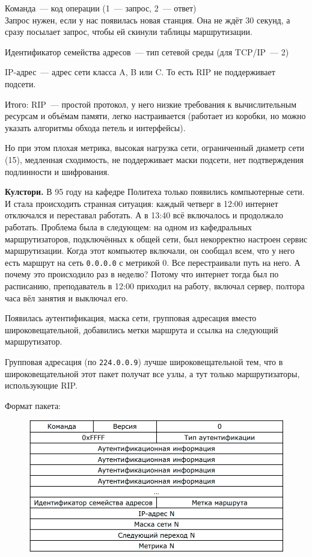\begin{MyItemize}
    \item Команда~--- код операции (1~--- запрос, 2~--- ответ)\\
    Запрос нужен, если у нас появилась новая станция. Она не ждёт 30 секунд, а сразу посылает запрос, чтобы ей скинули таблицы маршрутизации.
    \item Идентификатор семейства адресов~--- тип сетевой среды (для TCP/IP~--- 2)
    \item IP-адрес~--- адрес сети класса A, B или C. То есть RIP не поддерживает подсети.
\end{MyItemize}

Итого: RIP~--- простой протокол, у него низкие требования к вычислительным ресурсам и объёмам памяти, легко настраивается (работает из коробки, но можно указать алгоритмы обхода петель и интерфейсы).

Но при этом плохая метрика, высокая нагрузка сети, ограниченный диаметр сети (15), медленная сходимость, не поддерживает маски подсети, нет подтверждения подлинности и шифрования.

{\bf Кулстори.} В 95 году на кафедре Политеха только появились компьютерные сети. И стала происходить странная ситуация: каждый четверг в 12:00 интернет отключался и переставал работать. А в 13:40 всё включалось и продолжало работать. Проблема была в следующем: на одном из кафедральных маршрутизаторов, подключённых к общей сети, был некорректно настроен сервис маршрутизации. Когда этот компьютер включали, он сообщал всем, что у него есть маршрут на сеть {\tt 0.0.0.0} с метрикой 0. Все перестраивали путь на него. А почему это происходило раз в неделю? Потому что интернет тогда был по расписанию, преподаватель в 12:00 приходил на работу, включал сервер, полтора часа вёл занятия и выключал его.


Появилась аутентификация, маска сети, групповая адресация вместо широковещательной, добавились метки маршрута и ссылка на следующий маршрутизатор.

Групповая адресация (по {\tt 224.0.0.9}) лучше широковещательной тем, что в широковещательной этот пакет получат все узлы, а тут только маршрутизаторы, использующие RIP.

Формат пакета:

\begin{figure}[H]
  \centering
  \includegraphics[width=15cm]{images/04/08}
\end{figure}

